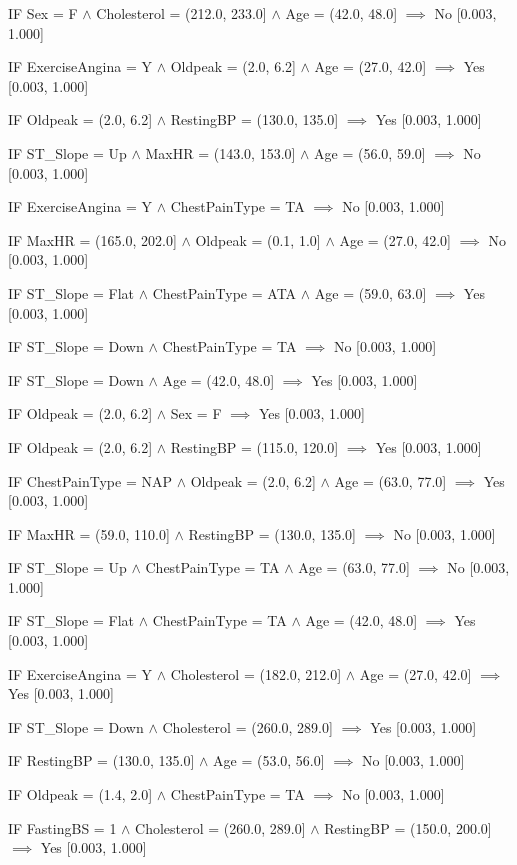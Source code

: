 IF Sex = F $\land$ Cholesterol = (212.0, 233.0] $\land$ Age = (42.0, 48.0] $\implies$ No [0.003, 1.000]

IF ExerciseAngina = Y $\land$ Oldpeak = (2.0, 6.2] $\land$ Age = (27.0, 42.0] $\implies$ Yes [0.003, 1.000]

IF Oldpeak = (2.0, 6.2] $\land$ RestingBP = (130.0, 135.0] $\implies$ Yes [0.003, 1.000]

IF ST\_Slope = Up $\land$ MaxHR = (143.0, 153.0] $\land$ Age = (56.0, 59.0] $\implies$ No [0.003, 1.000]

IF ExerciseAngina = Y $\land$ ChestPainType = TA $\implies$ No [0.003, 1.000]

IF MaxHR = (165.0, 202.0] $\land$ Oldpeak = (0.1, 1.0] $\land$ Age = (27.0, 42.0] $\implies$ No [0.003, 1.000]

IF ST\_Slope = Flat $\land$ ChestPainType = ATA $\land$ Age = (59.0, 63.0] $\implies$ Yes [0.003, 1.000]

IF ST\_Slope = Down $\land$ ChestPainType = TA $\implies$ No [0.003, 1.000]

IF ST\_Slope = Down $\land$ Age = (42.0, 48.0] $\implies$ Yes [0.003, 1.000]

IF Oldpeak = (2.0, 6.2] $\land$ Sex = F $\implies$ Yes [0.003, 1.000]

IF Oldpeak = (2.0, 6.2] $\land$ RestingBP = (115.0, 120.0] $\implies$ Yes [0.003, 1.000]

IF ChestPainType = NAP $\land$ Oldpeak = (2.0, 6.2] $\land$ Age = (63.0, 77.0] $\implies$ Yes [0.003, 1.000]

IF MaxHR = (59.0, 110.0] $\land$ RestingBP = (130.0, 135.0] $\implies$ No [0.003, 1.000]

IF ST\_Slope = Up $\land$ ChestPainType = TA $\land$ Age = (63.0, 77.0] $\implies$ No [0.003, 1.000]

IF ST\_Slope = Flat $\land$ ChestPainType = TA $\land$ Age = (42.0, 48.0] $\implies$ Yes [0.003, 1.000]

IF ExerciseAngina = Y $\land$ Cholesterol = (182.0, 212.0] $\land$ Age = (27.0, 42.0] $\implies$ Yes [0.003, 1.000]

IF ST\_Slope = Down $\land$ Cholesterol = (260.0, 289.0] $\implies$ Yes [0.003, 1.000]

IF RestingBP = (130.0, 135.0] $\land$ Age = (53.0, 56.0] $\implies$ No [0.003, 1.000]

IF Oldpeak = (1.4, 2.0] $\land$ ChestPainType = TA $\implies$ No [0.003, 1.000]

IF FastingBS = 1 $\land$ Cholesterol = (260.0, 289.0] $\land$ RestingBP = (150.0, 200.0] $\implies$ Yes [0.003, 1.000]

